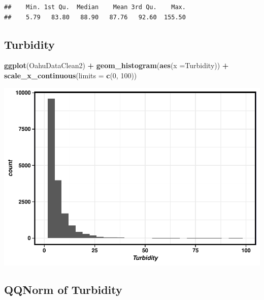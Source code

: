 \documentclass[12pt,]{article}
\newenvironment{Shaded}{\begin{snugshade}}{\end{snugshade}}
\newcommand{\KeywordTok}[1]{\textcolor[rgb]{0.13,0.29,0.53}{\textbf{#1}}}
\newcommand{\DataTypeTok}[1]{\textcolor[rgb]{0.13,0.29,0.53}{#1}}
\newcommand{\DecValTok}[1]{\textcolor[rgb]{0.00,0.00,0.81}{#1}}
\newcommand{\StringTok}[1]{\textcolor[rgb]{0.31,0.60,0.02}{#1}}
\newcommand{\OperatorTok}[1]{\textcolor[rgb]{0.81,0.36,0.00}{\textbf{#1}}}
\newcommand{\NormalTok}[1]{#1}
\begin{document}
\begin{verbatim}
##    Min. 1st Qu.  Median    Mean 3rd Qu.    Max. 
##    5.79   83.80   88.90   87.76   92.60  155.50
\end{verbatim}

\subsection{Turbidity}\label{turbidity}

\begin{Shaded}
\begin{Highlighting}[]
\KeywordTok{ggplot}\NormalTok{(OahuDataClean2) }\OperatorTok{+}
\StringTok{  }\KeywordTok{geom_histogram}\NormalTok{(}\KeywordTok{aes}\NormalTok{(}\DataTypeTok{x =}\NormalTok{Turbidity)) }\OperatorTok{+}
\StringTok{   }\KeywordTok{scale_x_continuous}\NormalTok{(}\DataTypeTok{limits =} \KeywordTok{c}\NormalTok{(}\DecValTok{0}\NormalTok{, }\DecValTok{100}\NormalTok{))}
\end{Highlighting}
\end{Shaded}

\includegraphics{Garcia_ENV872_Project_files/figure-latex/unnamed-chunk-40-1.pdf}

\subsection{QQNorm of Turbidity}\label{qqnorm-of-turbidity}

\begin{Shaded}
\end{Shaded}
\end{document}
